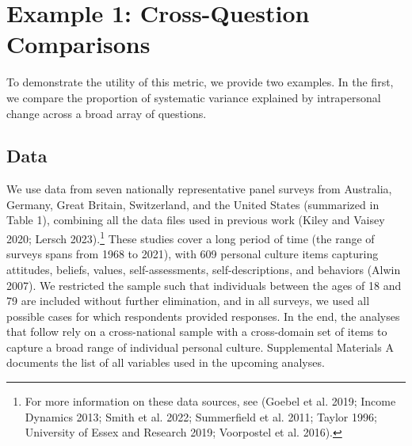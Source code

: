 \documentclass[
  11pt,
]{article}
\begin{document}
\section{Example 1: Cross-Question
Comparisons}\label{example-1-cross-question-comparisons}

To demonstrate the utility of this metric, we provide two examples. In
the first, we compare the proportion of systematic variance explained by
intrapersonal change across a broad array of questions.

\subsection{Data}\label{data}

We use data from seven nationally representative panel surveys from
Australia, Germany, Great Britain, Switzerland, and the United States
(summarized in Table 1), combining all the data files used in previous
work (Kiley and Vaisey 2020; Lersch 2023).\footnote{For more information
  on these data sources, see (Goebel et al. 2019; Income Dynamics 2013;
  Smith et al. 2022; Summerfield et al. 2011; Taylor 1996; University of
  Essex and Research 2019; Voorpostel et al. 2016).} These studies cover
a long period of time (the range of surveys spans from 1968 to 2021),
with 609 personal culture items capturing attitudes, beliefs, values,
self-assessments, self-descriptions, and behaviors (Alwin 2007). We
restricted the sample such that individuals between the ages of 18 and
79 are included without further elimination, and in all surveys, we used
all possible cases for which respondents provided responses. In the end,
the analyses that follow rely on a cross-national sample with a
cross-domain set of items to capture a broad range of individual
personal culture. Supplemental Materials A documents the list of all
variables used in the upcoming analyses.

\begin{table}[H]
\centering
\caption{\label{tab:unnamed-chunk-1}The Description of the Data Sources}
\centering
{}
\end{table}
\end{document}
